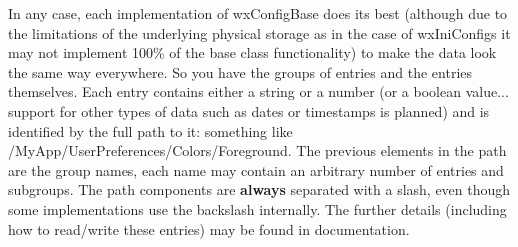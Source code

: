 In any case, each implementation of wxConfigBase does its best (although due
to the limitations of the underlying physical storage as in the case of
wxIniConfigs it may not implement 100\% of the base class functionality) to
make the data look the same way everywhere. So you have the groups of entries
and the entries themselves. Each entry contains either a string or a number
(or a boolean value... support for other types of data such as dates or
timestamps is planned) and is identified by the full path to it: something
like /MyApp/UserPreferences/Colors/Foreground. The previous elements in the
path are the group names, each name may contain an arbitrary number of entries
and subgroups. The path components are {\bf always} separated with a slash,
even though some implementations use the backslash internally. The further
details (including how to read/write these entries) may be found in
 documentation.

